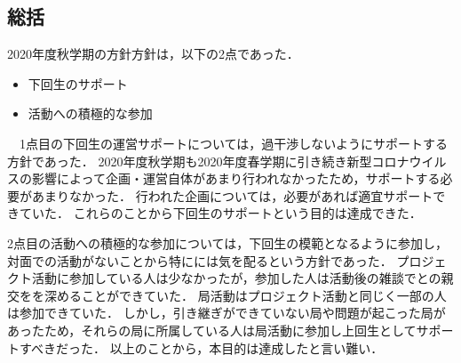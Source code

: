 \subsection*{\thirdGrade{}総括}


2020年度秋学期の\thirdGrade{}方針方針は，以下の2点であった．
\begin{itemize}
  \item 下回生のサポート
  \item 活動への積極的な参加
\end{itemize}
　1点目の下回生の運営サポートについては，過干渉しないようにサポートする方針であった．
2020年度秋学期も2020年度春学期に引き続き新型コロナウイルスの影響によって企画・運営自体があまり行われなかったため，サポートする必要があまりなかった．
行われた企画については，必要があれば適宜サポートできていた．
これらのことから下回生のサポートという目的は達成できた．

2点目の活動への積極的な参加については，下回生の模範となるように参加し，対面での活動がないことから特に\firstGrade{}には気を配るという方針であった．
プロジェクト活動に参加している人は少なかったが，参加した人は活動後の雑談で\firstGrade{}との親交をを深めることができていた．
局活動はプロジェクト活動と同じく一部の人は参加できていた．
しかし，引き継ぎができていない局や問題が起こった局があったため，それらの局に所属している人は局活動に参加し上回生としてサポートすべきだった．
以上のことから，本目的は達成したと言い難い．
